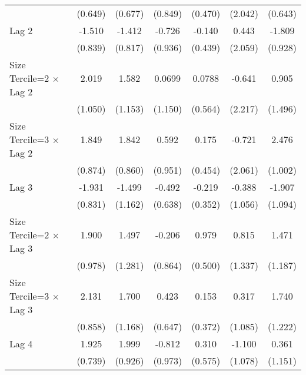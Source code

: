 \begin{table}[htbp]
\begin{tabular}{l*{6}{c}}
                &  (0.649)         &  (0.677)         &  (0.849)         &  (0.470)         &  (2.042)         &  (0.643)         \\
\addlinespace
Lag 2           &   -1.510         &   -1.412         &   -0.726         &   -0.140         &    0.443         &   -1.809         \\
                &  (0.839)         &  (0.817)         &  (0.936)         &  (0.439)         &  (2.059)         &  (0.928)         \\
\addlinespace
Size Tercile=2 $\times$ Lag 2&    2.019         &    1.582         &   0.0699         &   0.0788         &   -0.641         &    0.905         \\
                &  (1.050)         &  (1.153)         &  (1.150)         &  (0.564)         &  (2.217)         &  (1.496)         \\
\addlinespace
Size Tercile=3 $\times$ Lag 2&    1.849\sym{*}  &    1.842\sym{*}  &    0.592         &    0.175         &   -0.721         &    2.476\sym{*}  \\
                &  (0.874)         &  (0.860)         &  (0.951)         &  (0.454)         &  (2.061)         &  (1.002)         \\
\addlinespace
Lag 3           &   -1.931\sym{*}  &   -1.499         &   -0.492         &   -0.219         &   -0.388         &   -1.907         \\
                &  (0.831)         &  (1.162)         &  (0.638)         &  (0.352)         &  (1.056)         &  (1.094)         \\
\addlinespace
Size Tercile=2 $\times$ Lag 3&    1.900         &    1.497         &   -0.206         &    0.979         &    0.815         &    1.471         \\
                &  (0.978)         &  (1.281)         &  (0.864)         &  (0.500)         &  (1.337)         &  (1.187)         \\
\addlinespace
Size Tercile=3 $\times$ Lag 3&    2.131\sym{*}  &    1.700         &    0.423         &    0.153         &    0.317         &    1.740         \\
                &  (0.858)         &  (1.168)         &  (0.647)         &  (0.372)         &  (1.085)         &  (1.222)         \\
\addlinespace
Lag 4           &    1.925\sym{**} &    1.999\sym{*}  &   -0.812         &    0.310         &   -1.100         &    0.361         \\
                &  (0.739)         &  (0.926)         &  (0.973)         &  (0.575)         &  (1.078)         &  (1.151)         \\

\end{tabular}
\end{table}
